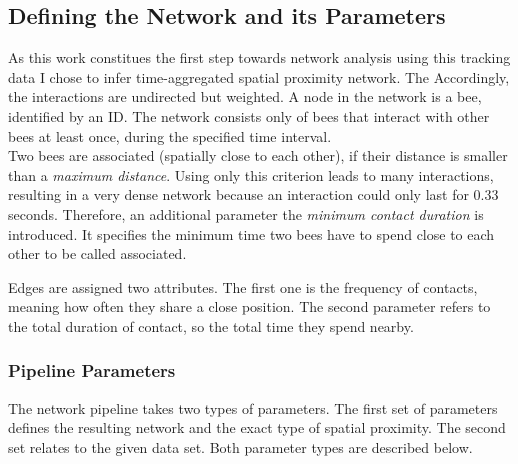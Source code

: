 \subsection{Defining the Network and its Parameters}
As this work constitues the first step towards network analysis using this tracking data I chose to infer time-aggregated spatial proximity network. The Accordingly, the interactions are undirected but weighted.
A node in the network is a bee, identified by an ID.
The network consists only of bees that interact with other bees at least once, during the specified time interval.\\
Two bees are associated (spatially close to each other), if their distance is smaller than a \emph{maximum distance}.
Using only this criterion leads to many interactions, resulting in a very dense network because an interaction could only last for 0.33 seconds.
Therefore, an additional parameter the \emph{minimum contact duration} is introduced.
It specifies the minimum time two bees have to spend close to each other to be called associated.

Edges are assigned two attributes.
The first one is the frequency of contacts, meaning how often they share a close position. The second parameter refers to the total duration of contact, so the total time they spend nearby.

\subsubsection{Pipeline Parameters}
The network pipeline takes two types of parameters. The first set of parameters defines the resulting network and the exact type of spatial proximity. The second set relates to the given data set. Both parameter types are described below.

